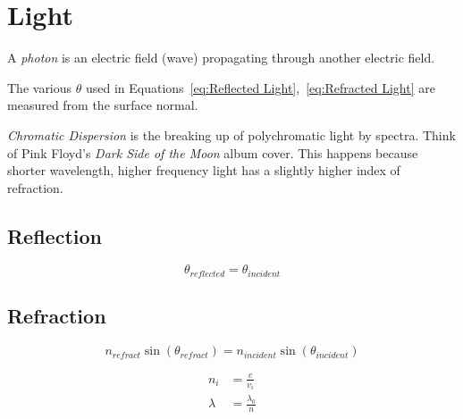\section{Light} \label{sec:Light}
	\begin{definition}[Photon]
		A \emph{photon} is an electric field (wave) propagating through another electric field.
	\end{definition}
The various $\theta$ used in Equations~\eqref{eq:Reflected Light},~\eqref{eq:Refracted Light} are measured from the surface normal.

\emph{Chromatic Dispersion} is the breaking up of polychromatic light by spectra.
Think of Pink Floyd's \textit{Dark Side of the Moon} album cover.
This happens because shorter wavelength, higher frequency light has a slightly higher index of refraction.

	\subsection*{Reflection} \label{subsec:Reflection}
		\begin{equation} \label{eq:Reflected Light}
			\theta_{reflected} = \theta_{incident}
		\end{equation}
		
	\subsection*{Refraction} \label{subsec:Refraction}
		\begin{definition} \label{def:Snell's Law}
			\begin{equation} \label{eq:Refracted Light} 
				n_{refract} \sin \left( \theta_{refract} \right) = n_{incident} \sin \left( \theta_{incident} \right)
			\end{equation}
		\end{definition}
		\begin{definition} \label{def:Index of Refraction}
			\begin{equation} \label{eq:Index of Refraction}
				\begin{aligned}
					n_{i} &= \frac{c}{v_{i}} \\
					\lambda &= \frac{\lambda_{0}}{n} \\
				\end{aligned}
			\end{equation}
		\end{definition}
	
